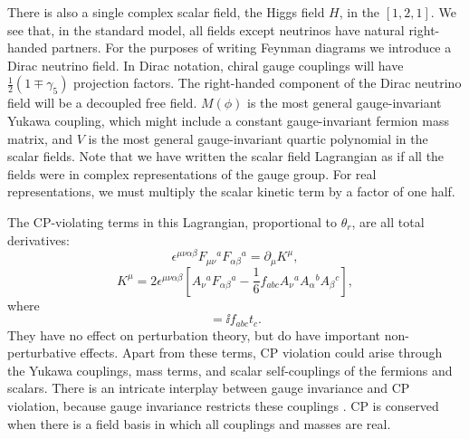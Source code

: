 There is also a single complex scalar field, the Higgs field $H$, in the
$[1,2,1]$. We see that, in the standard model, all fields except neutrinos have
natural right-handed partners. For the purposes of writing Feynman diagrams we
introduce a Dirac neutrino field. In Dirac notation, chiral gauge couplings
will have $\frac12(1\mp\gamma_5)$ projection factors. The right-handed
component of the Dirac neutrino field will be a decoupled free field. $M(\phi)$
is the most general gauge-invariant Yukawa coupling, which might include a
constant gauge-invariant fermion mass matrix, and $V$ is the most general
gauge-invariant quartic polynomial in the scalar fields. Note that we have
written the scalar field Lagrangian as if all the fields were in complex
representations of the gauge group. For real representations, we must multiply
the scalar kinetic term by a factor of one half.

The CP-violating terms in this Lagrangian, proportional to $\theta_r$, are all
total derivatives:
\begin{equation*}
  \epsilon^{\mu\nu\alpha\beta}F_{\mu\nu}{}^aF_{\alpha\beta}{}^a
  =\partial_\mu K^\mu,
\end{equation*}
\begin{equation*}
  K^\mu=2\epsilon^{\mu\nu\alpha\beta}\left[
  A_\nu{}^aF_{\alpha\beta}{}^a-\frac16f_{abc}A_\nu{}^aA_\alpha{}^bA_\beta{}^c\right],
\end{equation*}
where
\begin{equation*}
  [t_a,t_b]=\ii f_{abc}t_c.
\end{equation*}
They have no effect on perturbation theory, but do have important
non-perturbative effects. Apart from these terms, CP violation could arise
through the Yukawa couplings, mass terms, and scalar self-couplings of the
fermions and scalars. There is an intricate interplay between gauge invariance
and CP violation, because gauge invariance restricts these couplings \cite{banks-ref-30}. CP
is conserved when there is a field basis in which all couplings and masses are
real.
